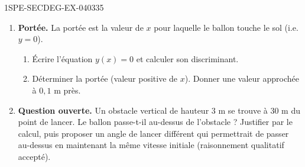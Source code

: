 \begin{exercice}{1SPE-SECDEG-EX-040}{3}{35}
\begin{enumerate}
  \item \textbf{Portée.} La portée est la valeur de $x$ pour laquelle le ballon touche le sol (i.e. $y = 0$).
  \begin{enumerate}
    \item Écrire l'équation $y(x) = 0$ et calculer son discriminant.
    \item Déterminer la portée (valeur positive de $x$). Donner une valeur approchée à $0{,}1$ m près.
  \end{enumerate}

  \item \textbf{Question ouverte.} Un obstacle vertical de hauteur $3$ m se trouve à $30$ m du point de lancer. Le ballon passe-t-il au-dessus de l'obstacle ? Justifier par le calcul, puis proposer un angle de lancer différent qui permettrait de passer au-dessus en maintenant la même vitesse initiale (raisonnement qualitatif accepté).
\end{enumerate}
\end{exercice}
